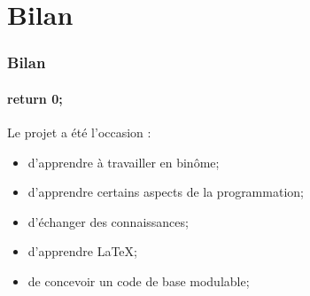 \documentclass{beamer}
\begin{document}
    \section{Bilan}
    \begin{frame}
    \frametitle{Bilan}
    \framesubtitle{return 0;}
        Le projet a été l'occasion :
        \begin{itemize}
            \item d'apprendre à travailler en binôme;
            \item d'apprendre certains aspects de la programmation;
            \item d'échanger des connaissances;
            \item d'apprendre LaTeX;
            \item de concevoir un code de base modulable;
        \end{itemize}

    \end{frame}



\end{document}
